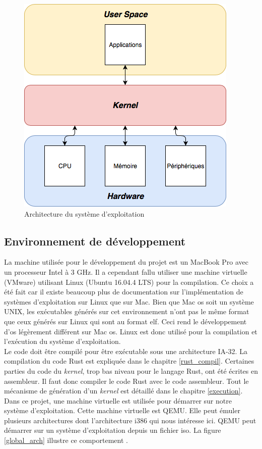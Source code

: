 \begin{figure}[!h]
    \centering
    \includegraphics[scale=0.75]{images/kernel.png}
    \caption{Architecture du système d'exploitation}
    \label{os_arch}
\end{figure}


\subsection{Environnement de développement}
\label{sec:arch:host}
La machine utilisée pour le développement du projet est un MacBook Pro avec un
processeur Intel à 3 GHz. Il a cependant fallu utiliser une machine virtuelle
(VMware) utilisant Linux (Ubuntu 16.04.4 LTS) pour la compilation. Ce choix a été
fait car il existe beaucoup plus de documentation sur l'implémentation de systèmes
d'exploitation sur Linux que sur Mac. Bien que Mac \acrshort{os} soit un système
UNIX, les exécutables générés sur cet environnement n'ont pas le même format que
ceux générés sur Linux qui sont au format \acrshort{elf}. Ceci rend le développement
d'\acrshort{os} légèrement différent sur Mac \acrshort{os}. Linux est donc utilisé
pour la compilation et l'exécution du système d'exploitation. \\

Le code doit être compilé pour être exécutable sous une architecture \acrshort{IA-32}.
La compilation du code Rust est expliquée dans le chapitre \ref{rust_compil}. Certaines
parties du code du \textit{kernel}, trop bas niveau pour le langage Rust, ont été
écrites en assembleur. Il faut donc compiler le code Rust avec le code assembleur.
Tout le mécanisme de génération d'un \textit{kernel} est détaillé
dans le chapitre \ref{execution}. Dans ce projet, une machine
virtuelle est utilisée pour démarrer sur notre système d'exploitation. Cette machine
virtuelle est QEMU. Elle peut émuler plusieurs architectures dont l'architecture
i386 qui nous intéresse ici. QEMU peut démarrer sur un système d'exploitation depuis
un fichier \acrshort{iso}. La figure \ref{global_arch} illustre ce comportement \cite{ref42}.

